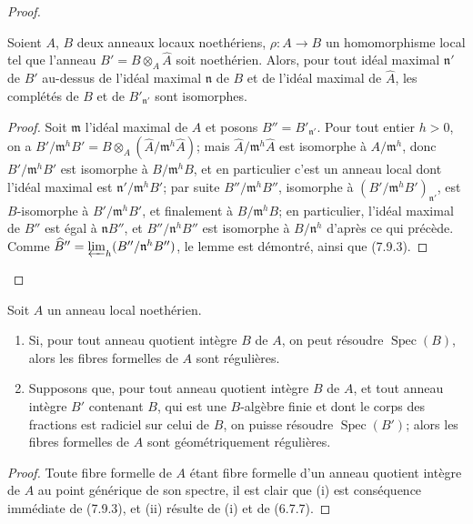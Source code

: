 \begin{proof}
\begin{lemma}[7.9.3.1]
\label{IV.2.s7.9.3.1-fr}
Soient $A$, $B$ deux anneaux locaux noethériens,
$\rho:A\to B$ un homomorphisme local tel que l'anneau
$B'=B\otimes_A\widehat A$ soit noethérien. Alors, pour tout idéal maximal
$\mathfrak n'$ de $B'$ au-dessus de l'idéal maximal $\mathfrak n$ de $B$ et
de l'idéal maximal de $\widehat A$, les complétés de $B$ et de
$B'_{\mathfrak n'}$ sont isomorphes.
\end{lemma}

\begin{proof}
Soit $\mathfrak m$ l'idéal maximal de $A$ et posons
$B''=B'_{\mathfrak n'}$. Pour tout entier $h>0$, on a
$B'/\mathfrak m^hB'=B\otimes_A(\widehat A/\mathfrak m^h\widehat A)$; mais
$\widehat A/\mathfrak m^h\widehat A$ est isomorphe à
$A/\mathfrak m^h$, donc $B'/\mathfrak m^hB'$ est isomorphe à
$B/\mathfrak m^hB$, et en particulier c'est un anneau local dont l'idéal
maximal est $\mathfrak n'/\mathfrak m^hB'$; par suite
$B''/\mathfrak m^hB''$, isomorphe à
$(B'/\mathfrak m^hB')_{\mathfrak n'}$, est $B$-isomorphe à
$B'/\mathfrak m^hB'$, et finalement à $B/\mathfrak m^hB$; en particulier,
l'idéal maximal de $B''$ est égal à $\mathfrak nB''$, et
$B''/\mathfrak n^hB''$ est isomorphe à $B/\mathfrak n^h$ d'après ce qui
précède. Comme
$\widehat{B}''=\varprojlim_h(B''/\mathfrak n^hB'')$, le lemme est démontré,
ainsi que (7.9.3).
\end{proof}
\end{proof}

\begin{corollary}[7.9.4]
\label{IV.2.s7.9.4-fr}
Soit $A$ un anneau local noethérien.
\begin{enumerate}
\item[\emph{(i)}] Si, pour tout anneau quotient intègre $B$ de $A$, on peut
résoudre $\operatorname{Spec}(B)$, alors les fibres formelles de $A$ sont
régulières.
\item[\emph{(ii)}] Supposons que, pour tout anneau quotient intègre $B$ de
$A$, et tout anneau intègre $B'$ contenant $B$, qui est une $B$-algèbre finie
et dont le corps des fractions est radiciel sur celui de $B$, on puisse
résoudre $\operatorname{Spec}(B')$; alors les fibres formelles de $A$ sont
géométriquement régulières.
\end{enumerate}
\end{corollary}

\begin{proof}
Toute fibre formelle de $A$ étant fibre formelle d'un anneau quotient intègre
de $A$ au point générique de son spectre, il est clair que (i) est conséquence
immédiate de (7.9.3), et (ii) résulte de (i) et de (6.7.7).
\end{proof}

